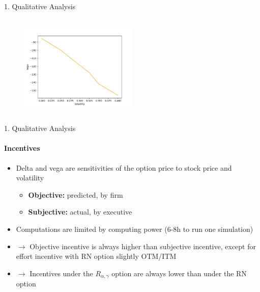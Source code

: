 \documentclass{beamer}
\begin{document}
\begin{frame}{1. Qualitative Analysis}
\begin{columns}[c]
\begin{column}{0.5\textwidth}
\begin{figure}[!h]
            \end{figure}
            \begin{figure}[!h]
                \centering
                \includegraphics[width=0.5\textwidth]{../fig/4/r_vega_subj.png}
            \end{figure}
        \end{column}
    \end{columns}
\end{frame}


\begin{frame}{1. Qualitative Analysis}
    \framesubtitle{Incentives}

    \begin{itemize}
        \item Delta and vega are sensitivities of the option price to stock price and volatility 
        \begin{itemize}
            \item \textbf{Objective:} predicted, by firm
            \item \textbf{Subjective:} actual, by executive 
        \end{itemize}
        \item Computations are limited by computing power (6-8h to run one simulation)
        \item $\rightarrow$ Objective incentive is always higher than subjective incentive, except for effort incentive with RN option slightly OTM/ITM
        \item $\rightarrow$ Incentives under the $R_{\alpha, \gamma}$ option are always lower than under the RN option
    \end{itemize}
\end{frame}
\end{document}
